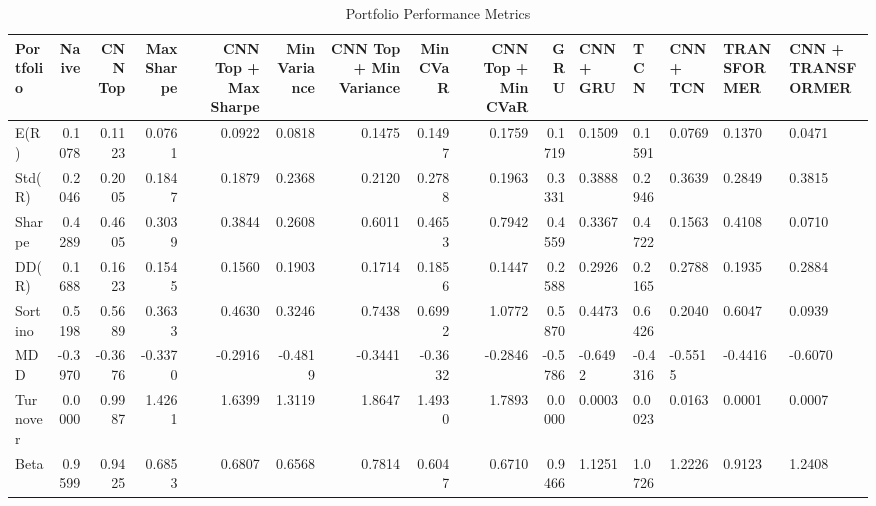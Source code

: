 \begin{table}[htbp]
\centering
\caption{Portfolio Performance Metrics}
\begin{tabular}{lrrrrrrrrr}
\hline
Portfolio & Naive & CNN Top & Max Sharpe & CNN Top + Max Sharpe & Min Variance & CNN Top + Min Variance & Min CVaR & CNN Top + Min CVaR & GRU & CNN + GRU & TCN & CNN + TCN & TRANSFORMER & CNN + TRANSFORMER \\
\hline
E(R) & 0.1078 & 0.1123 & 0.0761 & 0.0922 & 0.0818 & 0.1475 & 0.1497 & 0.1759 & 0.1719 & 0.1509 & 0.1591 & 0.0769 & 0.1370 & 0.0471 \\
Std(R) & 0.2046 & 0.2005 & 0.1847 & 0.1879 & 0.2368 & 0.2120 & 0.2788 & 0.1963 & 0.3331 & 0.3888 & 0.2946 & 0.3639 & 0.2849 & 0.3815 \\
Sharpe & 0.4289 & 0.4605 & 0.3039 & 0.3844 & 0.2608 & 0.6011 & 0.4653 & 0.7942 & 0.4559 & 0.3367 & 0.4722 & 0.1563 & 0.4108 & 0.0710 \\
DD(R) & 0.1688 & 0.1623 & 0.1545 & 0.1560 & 0.1903 & 0.1714 & 0.1856 & 0.1447 & 0.2588 & 0.2926 & 0.2165 & 0.2788 & 0.1935 & 0.2884 \\
Sortino & 0.5198 & 0.5689 & 0.3633 & 0.4630 & 0.3246 & 0.7438 & 0.6992 & 1.0772 & 0.5870 & 0.4473 & 0.6426 & 0.2040 & 0.6047 & 0.0939 \\
MDD & -0.3970 & -0.3676 & -0.3370 & -0.2916 & -0.4819 & -0.3441 & -0.3632 & -0.2846 & -0.5786 & -0.6492 & -0.4316 & -0.5515 & -0.4416 & -0.6070 \\
Turnover & 0.0000 & 0.9987 & 1.4261 & 1.6399 & 1.3119 & 1.8647 & 1.4930 & 1.7893 & 0.0000 & 0.0003 & 0.0023 & 0.0163 & 0.0001 & 0.0007 \\
Beta & 0.9599 & 0.9425 & 0.6853 & 0.6807 & 0.6568 & 0.7814 & 0.6047 & 0.6710 & 0.9466 & 1.1251 & 1.0726 & 1.2226 & 0.9123 & 1.2408 \\
\hline
\end{tabular}
\end{table}